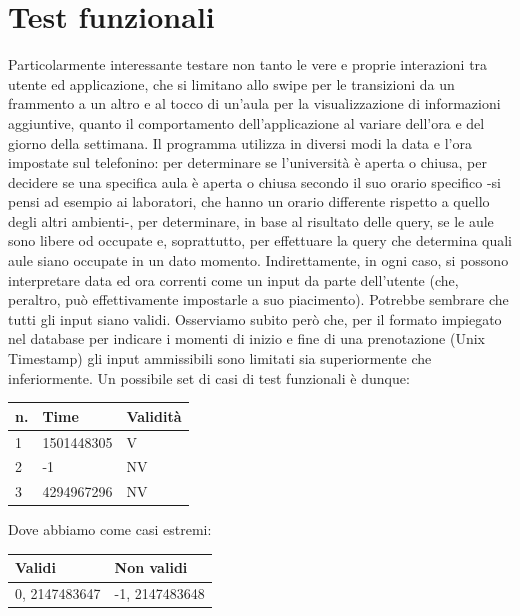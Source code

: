 \documentclass{article}
\begin{document}
	\part{Test funzionali}
	Particolarmente interessante testare non tanto le vere e proprie interazioni tra utente ed applicazione, che si limitano allo swipe per le transizioni da un frammento a un altro e al tocco di un'aula per la visualizzazione di informazioni aggiuntive, quanto il comportamento dell'applicazione al variare dell'ora e del giorno della settimana. Il programma utilizza in diversi modi la data e l'ora impostate sul telefonino: per determinare se l'università è aperta o chiusa, per decidere se una specifica aula è aperta o chiusa secondo il suo orario specifico -si pensi ad esempio ai laboratori, che hanno un orario differente rispetto a quello degli altri ambienti-, per determinare, in base al risultato delle query, se le aule sono libere od occupate e, soprattutto, per effettuare la query che determina quali aule siano occupate in un dato momento. Indirettamente, in ogni caso, si possono interpretare data ed ora correnti come un input da parte dell'utente (che, peraltro, può effettivamente impostarle a suo piacimento). Potrebbe sembrare che tutti gli input siano validi. Osserviamo subito però che, per il formato impiegato nel database per indicare i momenti di inizio e fine di una prenotazione (Unix Timestamp) gli input ammissibili sono limitati sia superiormente che inferiormente.
	Un possibile set di casi di test funzionali è dunque:\\
	
\begin{table}[h]
	\centering
	\label{my-label}
	\begin{tabular}{|l|l|l|}
		\hline
		n. & Time       & Validità \\ \hline
		1  & 1501448305 & V        \\ \hline
		2  & -1         & NV       \\ \hline
		3  & 4294967296 & NV       \\ \hline
	\end{tabular}
	
\end{table}

Dove abbiamo come casi estremi:

\begin{table}[h]
	\centering
	\label{my-label}
	\begin{tabular}{|l|l|}
		\hline
		Validi        & Non validi     \\ \hline
		0, 2147483647 & -1, 2147483648 \\ \hline
	\end{tabular}
\end{table}
\end{document}
